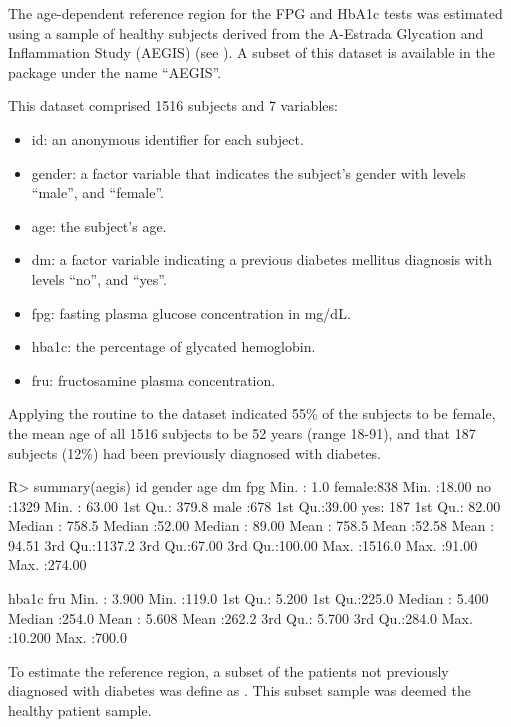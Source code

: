 The age-dependent reference region for the FPG and HbA1c tests was estimated using a sample of healthy subjects derived from the A-Estrada Glycation and Inflammation Study (AEGIS) (see \citep{gude2017glycemic}). A subset of this dataset is available in the package under the name ``AEGIS''.

This dataset comprised 1516 subjects and 7 variables:

\begin{itemize}
	\item id: an anonymous identifier for each subject.
	\item gender: a factor variable that indicates the subject's gender with levels ``male'', and ``female''.
	\item age: the subject's age.
	\item dm: a factor variable indicating a previous diabetes mellitus diagnosis with levels ``no'', and ``yes''.
	\item fpg: fasting plasma glucose concentration in mg/dL. 
	\item hba1c: the percentage of glycated hemoglobin. 
	\item fru: fructosamine plasma concentration.
\end{itemize}

Applying the  routine to the  dataset indicated 55\% of the subjects to be female, the mean age of all 1516 subjects to be 52 years (range 18-91), and that 187 subjects (12\%) had been previously diagnosed with diabetes.

\begin{example}
R> summary(aegis)
       id            gender         age          dm            fpg        
Min.   :   1.0   female:838   Min.   :18.00   no :1329   Min.   : 63.00  
1st Qu.: 379.8   male  :678   1st Qu.:39.00   yes: 187   1st Qu.: 82.00  
Median : 758.5                Median :52.00              Median : 89.00  
Mean   : 758.5                Mean   :52.58              Mean   : 94.51  
3rd Qu.:1137.2                3rd Qu.:67.00              3rd Qu.:100.00  
Max.   :1516.0                Max.   :91.00              Max.   :274.00  

hba1c             fru       
Min.   : 3.900   Min.   :119.0  
1st Qu.: 5.200   1st Qu.:225.0  
Median : 5.400   Median :254.0  
Mean   : 5.608   Mean   :262.2  
3rd Qu.: 5.700   3rd Qu.:284.0  
Max.   :10.200   Max.   :700.0  
\end{example}

To estimate the reference region, a subset of the patients not previously diagnosed with diabetes was define as . This subset sample was deemed the healthy patient sample.

